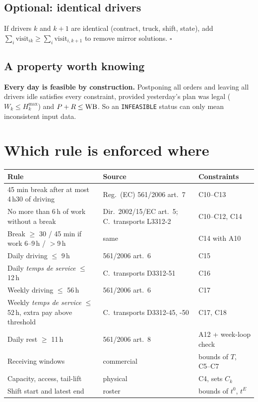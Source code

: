 \documentclass[11pt,a4paper]{article}
\newcommand{\ok}{$\square$}
\newcommand{\visit}{\mathrm{visit}}\newcommand{\used}{\mathrm{used}}
\begin{document}
\subsection{Optional: identical drivers}

If drivers $k$ and $k+1$ are identical (contract, truck, shift, state), add $\sum_i\visit_{ik} \ge \sum_i\visit_{i,k+1}$ to remove mirror solutions. \ok

\subsection{A property worth knowing}

\begin{words}
\textbf{Every day is feasible by construction.} Postponing all orders and leaving all drivers idle satisfies every constraint, provided yesterday's plan was legal ($W_k \le H^{\max}_k$) and $P + R \le \mathrm{WB}$. So an \texttt{INFEASIBLE} status can only mean inconsistent input data.
\end{words}

\section{Which rule is enforced where}

\begin{center}\small
\begin{tabularx}{\textwidth}{@{}X l l@{}}
\toprule
\textbf{Rule} & \textbf{Source} & \textbf{Constraints} \\
\midrule
45 min break after at most 4\,h30 of driving & Reg.\ (EC) 561/2006 art.\ 7 & C10--C13 \\
No more than 6\,h of work without a break & Dir.\ 2002/15/EC art.\ 5; C.\ transports L3312-2 & C10--C12, C14 \\
Break $\ge$ 30 / 45 min if work 6--9\,h / $>$9\,h & same & C14 with A10 \\
Daily driving $\le$ 9\,h & 561/2006 art.\ 6 & C15 \\
Daily \emph{temps de service} $\le$ 12\,h & C.\ transports D3312-51 & C16 \\
Weekly driving $\le$ 56\,h & 561/2006 art.\ 6 & C17 \\
Weekly \emph{temps de service} $\le$ 52\,h, extra pay above threshold & C.\ transports D3312-45, -50 & C17, C18 \\
Daily rest $\ge$ 11\,h & 561/2006 art.\ 8 & A12 + week-loop check \\
Receiving windows & commercial & bounds of $T$, C5--C7 \\
Capacity, access, tail-lift & physical & C4, sets $C_k$ \\
Shift start and latest end & roster & bounds of $t^0$, $t^E$ \\
\bottomrule
\end{tabularx}
\end{center}
\end{document}

